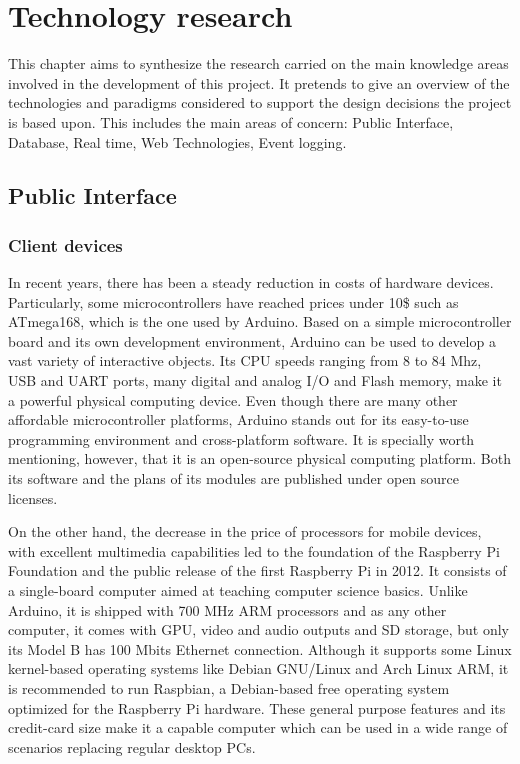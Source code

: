\chapter{Technology research}

This chapter aims to synthesize the research carried on the main knowledge areas involved in the development of this project. It pretends to give an overview of the technologies and paradigms considered to support the design decisions the project is based upon. This includes the main areas of concern: Public Interface, Database, Real time, Web Technologies, Event logging.

\section{Public Interface}

\subsection{Client devices}

In recent years, there has been a steady reduction in costs of hardware devices. Particularly, some microcontrollers have reached prices under 10\$ such as ATmega168, which is the one used by Arduino. Based on a simple microcontroller board and its own development environment, Arduino can be used to develop a vast variety of interactive objects. Its CPU speeds ranging from 8 to 84 Mhz, USB and UART ports, many digital and analog I/O and Flash memory, make it a powerful physical computing device. Even though there are many other affordable microcontroller platforms, Arduino stands out for its easy-to-use programming environment and cross-platform software. It is specially worth mentioning, however, that it is an open-source physical computing platform. Both its software and the plans of its modules are published under open source licenses.

On the other hand, the decrease in the price of processors for mobile devices, with excellent multimedia capabilities led to the foundation of the Raspberry Pi Foundation and the public release of the first Raspberry Pi in 2012. It consists of a single-board computer aimed at teaching computer science basics. Unlike Arduino, it is shipped with 700 MHz ARM processors and as any other computer, it comes with GPU, video and audio outputs and SD storage, but only its Model B has 100 Mbits Ethernet connection. Although it supports some Linux kernel-based operating systems like Debian GNU/Linux and Arch Linux ARM, it is recommended to run Raspbian, a Debian-based free operating system optimized for the Raspberry Pi hardware. These general purpose features and its credit-card size make it a capable computer which can be used in a wide range of scenarios replacing regular desktop PCs.

